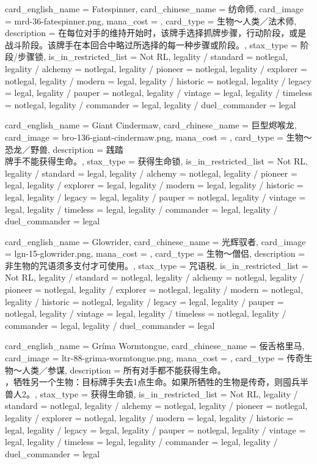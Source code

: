\documentclass[lang = cn, color = black, 10pt]{AllThatStax}
\begin{document}
\card
{
	card_english_name = {Fatespinner},
	card_chinese_name = {纺命师},
	card_image = mrd-36-fatespinner.png,
	mana_cost = ,
	card_type = 生物～人类／法术师,
	description = {在每位对手的维持开始时，该牌手选择抓牌步骤，行动阶段，或是战斗阶段。该牌手在本回合中略过所选择的每一种步骤或阶段。},
	stax_type = 阶段/步骤锁,
	is_in_restricted_list = Not RL,
	legality / standard = notlegal,
	legality / alchemy = notlegal,
	legality / pioneer = notlegal,
	legality / explorer = notlegal,
	legality / modern = legal,
	legality / historic = notlegal,
	legality / legacy = legal,
	legality / pauper = notlegal,
	legality / vintage = legal,
	legality / timeless = notlegal,
	legality / commander = legal,
	legality / duel_commander = legal
}

\card
{
	card_english_name = {Giant Cindermaw},
	card_chinese_name = {巨型烬喉龙},
	card_image = bro-136-giant-cindermaw.png,
	mana_cost = ,
	card_type = 生物～恐龙／野兽,
	description = {践踏\\
牌手不能获得生命。},
	stax_type = 获得生命锁,
	is_in_restricted_list = Not RL,
	legality / standard = legal,
	legality / alchemy = notlegal,
	legality / pioneer = legal,
	legality / explorer = legal,
	legality / modern = legal,
	legality / historic = legal,
	legality / legacy = legal,
	legality / pauper = notlegal,
	legality / vintage = legal,
	legality / timeless = legal,
	legality / commander = legal,
	legality / duel_commander = legal
}

\card
{
	card_english_name = {Glowrider},
	card_chinese_name = {光辉驭者},
	card_image = lgn-15-glowrider.png,
	mana_cost = ,
	card_type = 生物～僧侣,
	description = {非生物的咒语须多支付才可使用。},
	stax_type = 咒语税,
	is_in_restricted_list = Not RL,
	legality / standard = notlegal,
	legality / alchemy = notlegal,
	legality / pioneer = notlegal,
	legality / explorer = notlegal,
	legality / modern = notlegal,
	legality / historic = notlegal,
	legality / legacy = legal,
	legality / pauper = notlegal,
	legality / vintage = legal,
	legality / timeless = notlegal,
	legality / commander = legal,
	legality / duel_commander = legal
}

\card
{
	card_english_name = {Gríma Wormtongue},
	card_chinese_name = {佞舌格里马},
	card_image = ltr-88-grima-wormtongue.png,
	mana_cost = ,
	card_type = 传奇生物～人类／参谋,
	description = {所有对手都不能获得生命。\\
，牺牲另一个生物：目标牌手失去1点生命。如果所牺牲的生物是传奇，则囤兵半兽人2。},
	stax_type = 获得生命锁,
	is_in_restricted_list = Not RL,
	legality / standard = notlegal,
	legality / alchemy = notlegal,
	legality / pioneer = notlegal,
	legality / explorer = notlegal,
	legality / modern = legal,
	legality / historic = legal,
	legality / legacy = legal,
	legality / pauper = notlegal,
	legality / vintage = legal,
	legality / timeless = legal,
	legality / commander = legal,
	legality / duel_commander = legal
}
\end{document}
